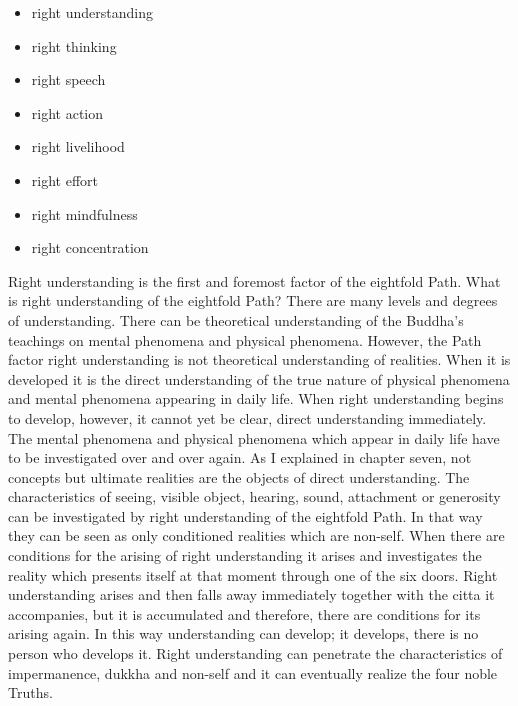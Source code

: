 \documentclass{book}
\begin{document}
\begin{itemize}
\item
  right understanding
\item
  right thinking
\item
  right speech
\item
  right action
\item
  right livelihood
\item
  right effort
\item
  right mindfulness
\item
  right concentration
\end{itemize}

Right understanding is the first and foremost factor of the eightfold
Path. What is right understanding of the eightfold Path? There are many
levels and degrees of under­standing. There can be theoretical
understanding of the Buddha's teachings on mental phenomena and physical
phenomena. However, the Path factor right understanding is not
theo­retical understanding of realities. When it is developed it is the
direct understanding of the true nature of physical phenomena and mental
phenomena appearing in daily life. When right understanding begins to
develop, however, it cannot yet be clear, direct understanding
immediately. The mental phenomena and physical phenomena which appear in
daily life have to be investigated over and over again. As I explained
in chapter seven, not concepts but ultimate realities are the objects of
direct understanding. The characteristics of seeing, visible object,
hearing, sound, attachment or generosity can be investigated by right
understanding of the eightfold Path. In that way they can be seen as
only conditioned realities which are non-self. When there are conditions
for the arising of right understanding it arises and investigates the
reality which presents itself at that moment through one of the six
doors. Right understanding arises and then falls away immediately
together with the citta it accompa­nies, but it is accumulated and
therefore, there are conditions for its arising again. In this way
understanding can develop; it develops, there is no person who develops
it. Right under­standing can penetrate the characteristics of
imper­manence, dukkha and non-self and it can eventually realize the
four noble Truths.
\end{document}
